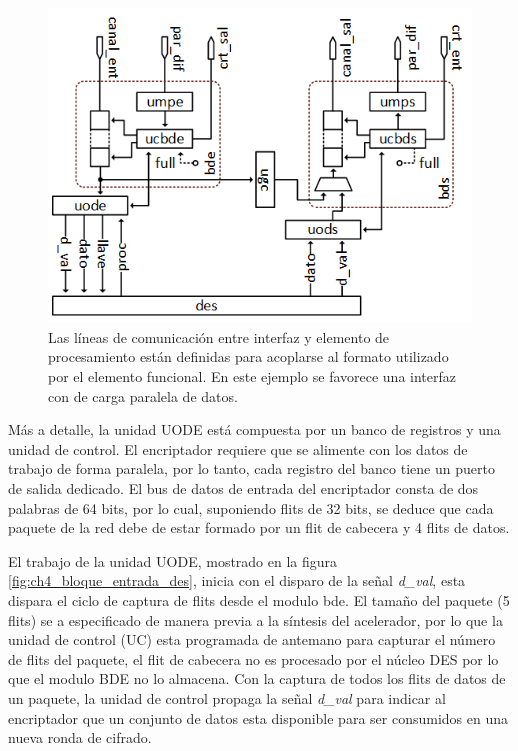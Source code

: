\begin{figure}
	\begin{center}
		\includegraphics[scale = 0.8]{figures/ch4_interfaz_des.png}
	\end{center}
	\caption
		{	
			Las líneas de comunicación entre interfaz y elemento de procesamiento están definidas para acoplarse al formato utilizado por el elemento funcional. En este ejemplo se favorece una interfaz con de carga paralela de datos.
		}
	\label{fig:ch4_interfaz_des}
\end{figure}

Más a detalle, la unidad UODE está compuesta por un banco de registros y una unidad de control. El encriptador requiere que se alimente con los datos de trabajo de forma paralela, por lo tanto, cada registro del banco tiene un puerto de salida dedicado. El bus de datos de entrada del encriptador consta de dos palabras de 64 bits, por lo cual, suponiendo flits de 32 bits, se deduce que cada paquete de la red debe de estar formado por un flit de cabecera y 4 flits de datos.

El trabajo de la unidad UODE, mostrado en la figura \ref{fig:ch4_bloque_entrada_des}, inicia con el disparo de la señal \textit{d\_val}, esta dispara el ciclo de captura de flits desde el modulo bde. El tamaño del paquete (5 flits) se a especificado de manera previa a la síntesis del acelerador, por lo que la unidad de control (UC) esta programada de antemano para capturar el número de flits del paquete, el flit de cabecera no es procesado por el núcleo DES por lo que el modulo BDE no lo almacena. Con la captura de todos los flits de datos de un paquete, la unidad de control propaga la señal \textit{d\_val} para indicar al encriptador que un conjunto de datos esta disponible para ser consumidos en una nueva ronda de cifrado.


